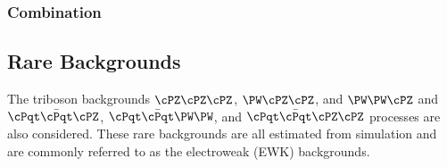  
\subsubsection{Combination}
\label{sec:zxComb}



\subsection{Rare Backgrounds}
\label{sec:rare}
The triboson backgrounds $\cPZ\cPZ\cPZ$, $\PW\cPZ\cPZ$, and $\PW\PW\cPZ$ and $\ttZ$, $\ttWW$, and $\ttZZ$ processes are also considered.
These rare backgrounds are all estimated from simulation and are commonly referred to as the electroweak (EWK) backgrounds.
